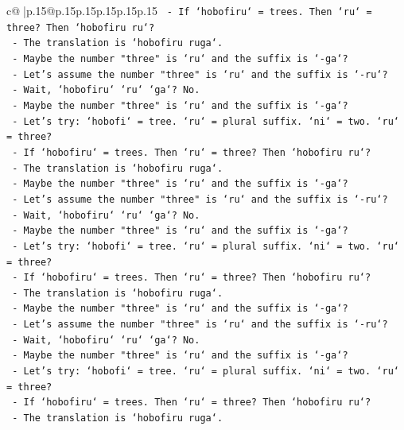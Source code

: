 \documentclass{article}
\begin{document}
{\begin{supertabular}{c@{$\;$}|p{.15\linewidth}@{}p{.15\linewidth}p{.15\linewidth}p{.15\linewidth}p{.15\linewidth}p{.15\linewidth}}
{{{\texttt{    {-} If `hobofiru` = trees. Then `ru` = three? Then `hobofiru ru`?} \\
\texttt{    {-} The translation is `hobofiru ruga`.} \\
\texttt{    {-} Maybe the number "three" is `ru` and the suffix is `{-}ga`?} \\
\texttt{    {-} Let's assume the number "three" is `ru` and the suffix is `{-}ru`?} \\
\texttt{    {-} Wait, `hobofiru` `ru` `ga`? No.} \\
\texttt{    {-} Maybe the number "three" is `ru` and the suffix is `{-}ga`?} \\
\texttt{    {-} Let's try: `hobofi` = tree. `ru` = plural suffix. `ni` = two. `ru` = three?} \\
\texttt{    {-} If `hobofiru` = trees. Then `ru` = three? Then `hobofiru ru`?} \\
\texttt{    {-} The translation is `hobofiru ruga`.} \\
\texttt{    {-} Maybe the number "three" is `ru` and the suffix is `{-}ga`?} \\
\texttt{    {-} Let's assume the number "three" is `ru` and the suffix is `{-}ru`?} \\
\texttt{    {-} Wait, `hobofiru` `ru` `ga`? No.} \\
\texttt{    {-} Maybe the number "three" is `ru` and the suffix is `{-}ga`?} \\
\texttt{    {-} Let's try: `hobofi` = tree. `ru` = plural suffix. `ni` = two. `ru` = three?} \\
\texttt{    {-} If `hobofiru` = trees. Then `ru` = three? Then `hobofiru ru`?} \\
\texttt{    {-} The translation is `hobofiru ruga`.} \\
\texttt{    {-} Maybe the number "three" is `ru` and the suffix is `{-}ga`?} \\
\texttt{    {-} Let's assume the number "three" is `ru` and the suffix is `{-}ru`?} \\
\texttt{    {-} Wait, `hobofiru` `ru` `ga`? No.} \\
\texttt{    {-} Maybe the number "three" is `ru` and the suffix is `{-}ga`?} \\
\texttt{    {-} Let's try: `hobofi` = tree. `ru` = plural suffix. `ni` = two. `ru` = three?} \\
\texttt{    {-} If `hobofiru` = trees. Then `ru` = three? Then `hobofiru ru`?} \\
\texttt{    {-} The translation is `hobofiru ruga`.} \\
}}}
\end{supertabular}}
\end{document}
